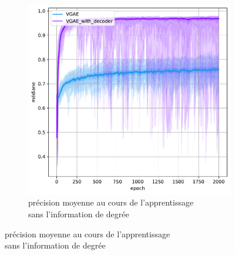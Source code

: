 \documentclass{article}
\begin{document}
\begin{figure}[H]
\begin{subfigure}{0.45\textwidth}
      \includegraphics[width=\textwidth]{graphics/APs_no_degree_decoder_cinf.svg.pdf}
      \centering
      \caption{précision moyenne au cours de l'apprentissage\\ sans l'information de degrée}
    \end{subfigure}
    

\end{figure}
\end{document}
